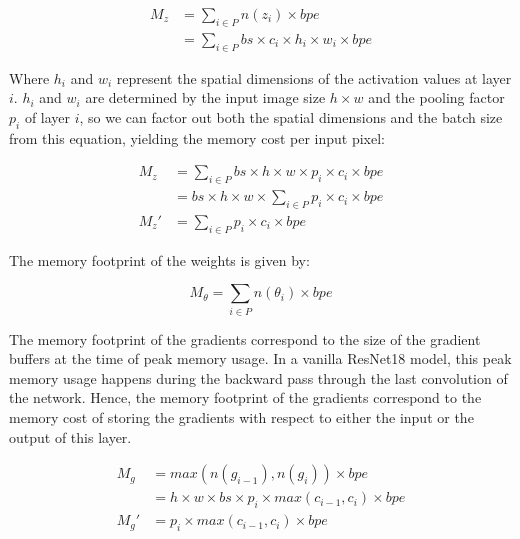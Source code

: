 \documentclass[twocolumn]{bmcart}
\begin{document}
\begin{subequations}
\begin{align}
M_{z} &= \sum_{i \in P} n(z_i) \times bpe \\
      &= \sum_{i \in P} bs \times c_i \times h_i \times w_i \times bpe
\end{align}
\end{subequations}

Where $h_i$ and $w_i$ represent the spatial dimensions of the activation values at layer $i$.
$h_i$ and $w_i$ are determined by the input image size $h \times w$ and the pooling factor $p_i$ of layer $i$,
so we can factor out both the spatial dimensions and the batch size from this equation,
yielding the memory cost per input pixel:

\begin{subequations}
\begin{align}
M_{z}  &= \sum_{i \in P} bs \times h \times w \times p_i \times c_i \times bpe \\
       &= bs \times h \times w \times \sum_{i \in P} p_i \times c_i \times bpe \\
M_{z}' &= \sum_{i \in P} p_i \times c_i \times bpe
\end{align}
\end{subequations}

The memory footprint of the weights is given by:

\begin{equation}
 M_{\theta} = \sum_{i \in P}  n(\theta_i)\times bpe
\end{equation}

The memory footprint of the gradients correspond to the size of the gradient buffers at the time of peak memory usage.
In a vanilla ResNet18 model, this peak memory usage happens during the backward pass through the last convolution of the network.
Hence, the memory footprint of the gradients correspond to the memory cost of storing the gradients with respect to either the input or the output of this layer.

\begin{subequations}
\begin{align}
M_{g}  &= max(n(g_{i-1}), n(g_i)) \times bpe \\
       &= h \times w \times bs \times p_i \times max(c_{i-1}, c_i) \times bpe\\
M_{g}' &= p_i \times max(c_{i-1}, c_i) \times bpe
\end{align}
\end{subequations}
\end{document}
